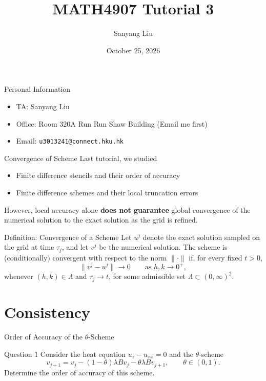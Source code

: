 \documentclass{beamer}
\title{MATH4907 Tutorial 3}
\author{Sanyang Liu}
\date{October 25, 2026}
\begin{document}
\maketitle
{}

\begin{frame}{Personal Information}
\begin{itemize}
  \item TA: Sanyang Liu
  \item Office: Room 320A Run Run Shaw Building (Email me first)
  \item Email: \texttt{u3013241@connect.hku.hk}
\end{itemize}
\end{frame}

\begin{frame}{Convergence of Scheme}
Last tutorial, we studied
\begin{itemize}
    \item Finite difference stencils and their order of accuracy
    \item Finite difference schemes and their local truncation errors
\end{itemize}

However, local accuracy alone \textbf{does not guarantee} global convergence of the numerical solution to the exact solution as the grid is refined.

\begin{block}{Definition: Convergence of a Scheme}
Let $u^j$ denote the exact solution sampled on the grid at time $\tau_j$,
and let $v^j$ be the numerical solution. The scheme is (conditionally)
convergent with respect to the norm $\|\cdot\|$ if, for every fixed $t>0$,
\[
\|v^j-u^j\|\longrightarrow 0
\qquad\text{as } h,k\longrightarrow 0^+,
\]
whenever $(h,k)\in\Lambda$ and $\tau_j\longrightarrow t$, for some
admissible set $\Lambda\subset(0,\infty)^2$.
\end{block}
\end{frame}


\section{Consistency}
\begin{frame}{Order of Accuracy of the $\theta$-Scheme}
\begin{block}{Question 1}
Consider the heat equation $u_\tau-u_{xx}=0$
and the $\theta$-scheme
\[
v_{j+1}=v_j-(1-\theta)\lambda Bv_j-\theta\lambda Bv_{j+1},
\qquad \theta\in(0,1).
\]
Determine the order of accuracy of this scheme.
\end{block}
\end{frame}
\end{document}
